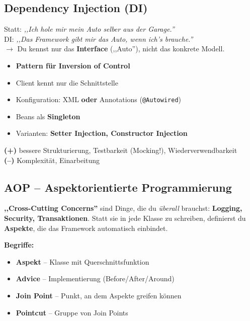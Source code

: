 \documentclass[11pt,a4paper]{article}
\begin{document}
\subsection{Dependency Injection (DI)}

\begin{story}
Statt: \emph{,,Ich hole mir mein Auto selber aus der Garage.''}\\
DI: \emph{,,Das Framework gibt mir das Auto, wenn ich's brauche.''}\\
$\rightarrow$ Du kennst nur das \textbf{Interface} (,,Auto''), nicht das konkrete Modell.
\end{story}

\begin{keyfacts}
\begin{itemize}
  \item \textbf{Pattern für Inversion of Control}
  \item Client kennt nur die Schnittstelle
  \item Konfiguration: XML \textbf{oder} Annotations (\texttt{@Autowired})
  \item Beans als \textbf{Singleton}
  \item Varianten: \textbf{Setter Injection, Constructor Injection}
\end{itemize}
\textbf{(+)} bessere Strukturierung, Testbarkeit (Mocking!), Wiederverwendbarkeit\\
\textbf{(--)} Komplexität, Einarbeitung
\end{keyfacts}

\subsection{AOP -- Aspektorientierte Programmierung}

\begin{story}
\textbf{,,Cross-Cutting Concerns''} sind Dinge, die du \emph{überall} brauchst: \textbf{Logging, Security, Transaktionen}. Statt sie in jede Klasse zu schreiben, definierst du \textbf{Aspekte}, die das Framework automatisch einbindet.
\end{story}

\begin{keyfacts}
\textbf{Begriffe:}
\begin{itemize}
  \item \textbf{Aspekt} -- Klasse mit Querschnittsfunktion
  \item \textbf{Advice} -- Implementierung (Before/After/Around)
  \item \textbf{Join Point} -- Punkt, an dem Aspekte greifen können
  \item \textbf{Pointcut} -- Gruppe von Join Points
\end{itemize}
\end{keyfacts}
\end{document}
